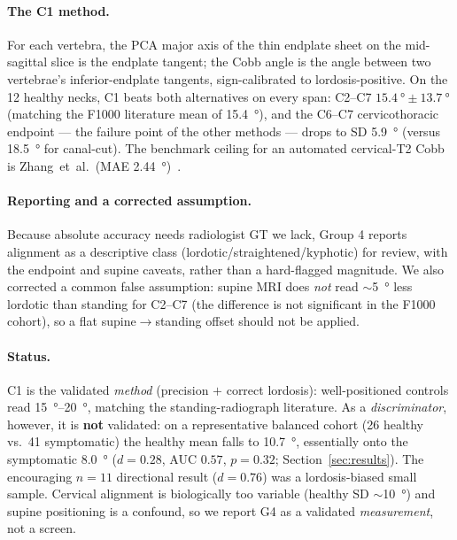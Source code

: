 \paragraph{The C1 method.} For each vertebra, the PCA major axis of the thin endplate sheet on the
mid-sagittal slice is the endplate tangent; the Cobb angle is the angle between two vertebrae's
inferior-endplate tangents, sign-calibrated to lordosis-positive. On the 12 healthy necks, C1 beats both
alternatives on every span: C2--C7 $\SI{+15.4}{\degree}\pm\SI{13.7}{\degree}$ (matching the F1000
literature mean of \SI{15.4}{\degree}), and the C6--C7 cervicothoracic endpoint --- the failure point of
the other methods --- drops to SD \SI{5.9}{\degree} (versus \SI{18.5}{\degree} for canal-cut). The
benchmark ceiling for an automated cervical-T2 Cobb is Zhang~et~al.\ (MAE \SI{2.44}{\degree})~\cite{zhang2025}.

\paragraph{Reporting and a corrected assumption.} Because absolute accuracy needs radiologist GT we lack,
Group 4 reports alignment as a descriptive class (lordotic/straightened/kyphotic) for review, with the
endpoint and supine caveats, rather than a hard-flagged magnitude. We also corrected a common false
assumption: supine MRI does \emph{not} read $\sim$\SI{5}{\degree} less lordotic than standing for C2--C7
(the difference is not significant in the F1000 cohort), so a flat supine$\rightarrow$standing offset
should not be applied.

\paragraph{Status.} C1 is the validated \emph{method} (precision $+$ correct lordosis): well-positioned
controls read \SIrange{+15}{+20}{\degree}, matching the standing-radiograph literature. As a
\emph{discriminator}, however, it is \textbf{not} validated: on a representative balanced cohort (26
healthy vs.\ 41 symptomatic) the healthy mean falls to \SI{+10.7}{\degree}, essentially onto the
symptomatic \SI{+8.0}{\degree} ($d=0.28$, AUC $0.57$, $p=0.32$; Section~\ref{sec:results}). The
encouraging $n{=}11$ directional result ($d=0.76$) was a lordosis-biased small sample. Cervical alignment
is biologically too variable (healthy SD $\sim$\SI{10}{\degree}) and supine positioning is a confound, so
we report G4 as a validated \emph{measurement}, not a screen.

